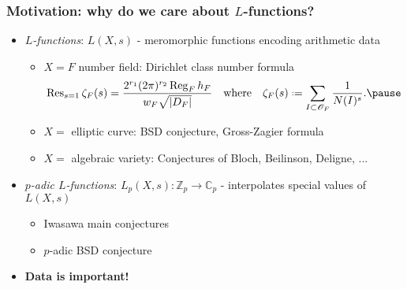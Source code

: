 \documentclass[10pt]{beamer}
\newcommand{\Z}{\mathbb{Z}}
\newcommand{\C}{\mathbb{C}}
\renewcommand{\O}{\mathscr{O}}
\newcommand*{\defeq}{\mathrel{\vcenter{\baselineskip0.5ex \lineskiplimit0pt
      \hbox{\scriptsize.}\hbox{\scriptsize.}}}%
  =}
\DeclareMathOperator{\Reg}{Reg}
\begin{document}
\begin{frame}
  \frametitle{Motivation: why do we care about $L$-functions?}
\begin{itemize}[leftmargin=2pt]\pause
\item \emph{$L$-functions}: $L(X,s)$ - meromorphic functions encoding
  arithmetic data\pause 
  \begin{itemize}
  \item $X = F$ number field: Dirichlet class number formula \pause
    \[ \Res_{s=1}\zeta_{F}(s)= \frac{2^{r_{1}}(2\pi)^{r_{2}}\Reg_{F}h_{F}
      }{w_{F}\sqrt{|D_{F}|}} \qq{where} \zeta_{F}(s) \defeq \sum_{I \subset \O_{F}}
      \frac{1}{N(I)^{s}}. \pause
    \]
  \item $X = $ elliptic curve: BSD conjecture, Gross-Zagier formula\pause
  \item $X = $ algebraic variety: Conjectures of Bloch, Beilinson, Deligne, ... \pause 
  \end{itemize}
\item \emph{$p$-adic $L$-functions}: 
  $L_{p}(X,s) \colon \Z_{p}\to \C_{p}$ - interpolates special values of
  $L(X,s)$ \pause 
\begin{itemize}
\item Iwasawa main conjectures \pause
\item $p$-adic BSD conjecture \pause
\end{itemize} 
\item \textbf{Data is important!}
\end{itemize}

\end{frame}
\end{document}
